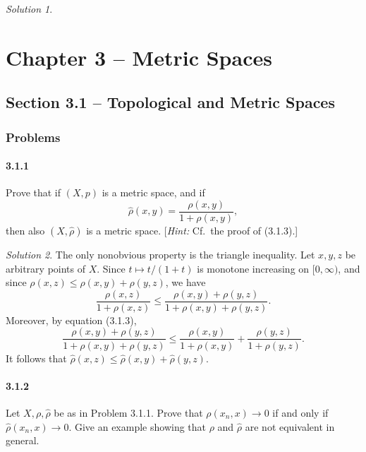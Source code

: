\documentclass{report}
\theoremstyle{remark}
\newtheorem*{solution}{Solution}
\begin{document}
\begin{solution}

\end{solution}

\chapter*{Chapter 3 -- Metric Spaces}

\section*{Section 3.1 -- Topological and Metric Spaces}

\subsection*{Problems}

\subsubsection*{3.1.1}
Prove that if $(X,p)$ is a metric space, and if
\begin{equation*}
  \hat \rho(x,y) = \frac{\rho(x,y)}{1 + \rho(x,y)},
\end{equation*}
then also $(X,\hat \rho)$ is a metric space. [\emph{Hint:} Cf.\ the proof of (3.1.3).]

\begin{solution}
  The only nonobvious property is the triangle inequality. Let $x,y,z$ be arbitrary points of $X$. Since $t \mapsto t/(1+t)$ is monotone increasing on $[0,\infty)$, and since $\rho(x,z) \le \rho(x,y) + \rho(y,z)$, we have
  \begin{equation*}
    \frac{\rho(x,z)}{1 + \rho(x,z)} \le \frac{\rho(x,y) + \rho(y,z)}{1 + \rho(x,y) + \rho(y,z)}.
  \end{equation*}
  Moreover, by equation (3.1.3),
  \begin{equation*}
    \frac{\rho(x,y) + \rho(y,z)}{1 + \rho(x,y) + \rho(y,z)} \le \frac{\rho(x,y)}{1 + \rho(x,y)} + \frac{\rho(y,z)}{1 + \rho(y,z)}.
  \end{equation*}
  It follows that $\hat \rho(x,z) \le \hat \rho(x,y) + \hat \rho(y,z)$.
\end{solution}

\subsubsection*{3.1.2}
Let $X, \rho, \hat \rho$ be as in Problem 3.1.1. Prove that $\rho(x_n, x) \to 0$ if and only if $\hat \rho(x_n, x) \to 0$. Give an example showing that $\rho$ and $\hat \rho$ are not equivalent in general.
\end{document}
